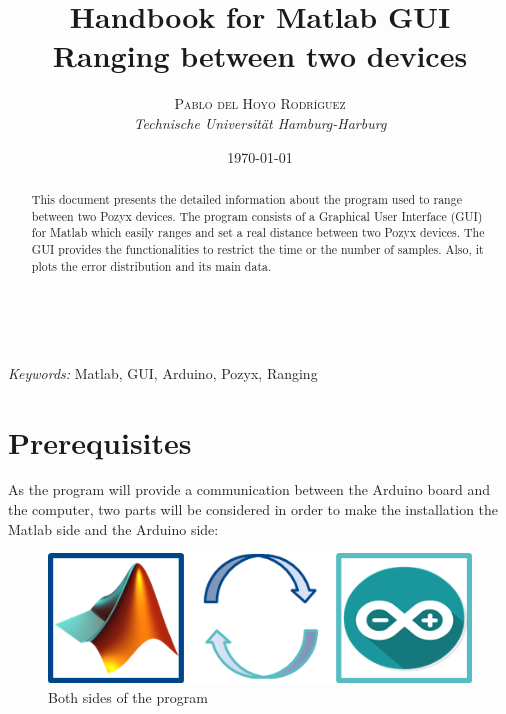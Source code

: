 \documentclass[a4paper, 21pt]{article} %
\title{\textbf{Handbook for Matlab GUI}\\ %
Ranging between two devices} %
\author{\textsc{Pablo del Hoyo Rodríguez} %
\\{\textit{Technische Universität Hamburg-Harburg}}} %
\date{\today} %
\makeatletter
\renewcommand{\maketitle}{ %
\begin{flushright} %
{\LARGE\@title} %

\vspace{50pt} %

{\large\@author} %
\\\@date %

\vspace{40pt} %
\end{flushright}
}
\makeatother
\begin{document}
\maketitle %



\begin{abstract}
This document presents the detailed information about the program used to range between two Pozyx devices. The program consists of a Graphical User Interface (GUI) for Matlab which easily ranges and set a real distance between two Pozyx devices. The GUI provides the functionalities to restrict the time or the number of samples. Also, it plots the error distribution and its main data.
\end{abstract}

\hspace*{3,6mm}\textit{Keywords:} Matlab, GUI, Arduino, Pozyx, Ranging %

\vspace{30pt} %

\tableofcontents
\newpage

\section{Prerequisites}


As the program will provide a communication between the Arduino board and the computer, two parts will be considered in order to make the installation the Matlab side and the Arduino side:\\
\begin{figure}[!hbbp]
\begin{center}
\includegraphics[scale=0.8]{fig/matlab_arduino.png}
\end{center}
\caption{Both sides of the program}
\end{figure}
\end{document}

